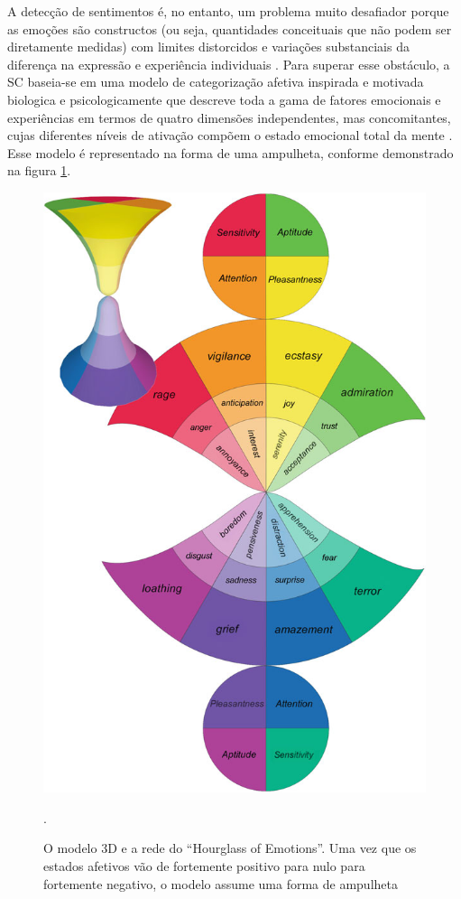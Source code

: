 \documentclass[
	12pt,				%
	openright,			%
	oneside,			%
	a4paper,			%
	english,			%
	spanish,			%
	brazil				%
	]{abntex2}
\begin{document}
A detecção de sentimentos é, no entanto, um problema muito desafiador porque as emoções são constructos (ou seja, quantidades conceituais que não podem ser diretamente medidas) com limites distorcidos e variações substanciais da diferença na expressão e experiência individuais \cite{inBook_Bisio2016} . Para superar esse obstáculo, a SC baseia-se em uma modelo de categorização afetiva inspirada e motivada biologica e  psicologicamente que descreve toda a gama de fatores emocionais e experiências em termos de quatro dimensões independentes, mas concomitantes, cujas diferentes níveis de ativação compõem o estado emocional total da mente \cite{book_Cambria2015}. Esse modelo é representado na forma de uma ampulheta, conforme demonstrado na figura \ref{SenticHourGlass}.


\begin{figure}[!h]
\centering
\includegraphics[scale=1.4]{SenticHourGlass}
\caption {O modelo 3D e a rede do ``Hourglass of Emotions''. Uma vez que os estados afetivos vão de fortemente positivo para nulo para fortemente negativo, o modelo assume uma forma de ampulheta \cite{book_Cambria2015}}.
\label{SenticHourGlass}
\end{figure}
\end{document}
